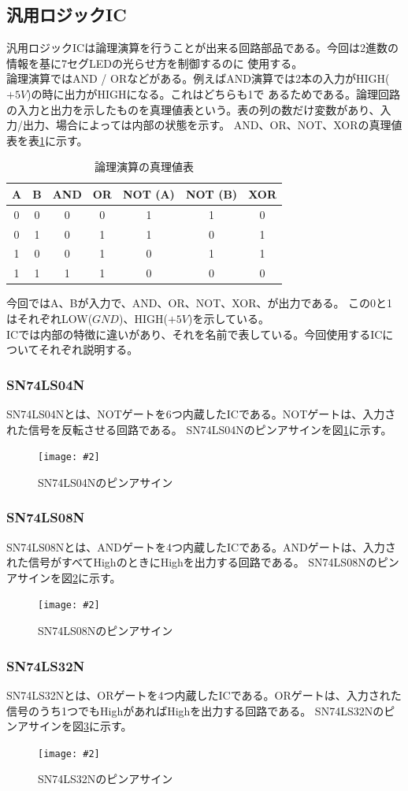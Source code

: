 \documentclass[a4paper,11pt,dvipdfmx]{jsarticle}
\newcommand{\Figure}[4]{
  \begin{figure}[H]
    \centering
    \texttt{[image: \#2]}
    \caption{#3}
    \label{fig:#4}
  \end{figure}
}
\begin{document}
\subsection{汎用ロジックIC}
汎用ロジックICは論理演算を行うことが出来る回路部品である。今回は2進数の情報を基に7セグLEDの光らせ方を制御するのに
使用する。\\
論理演算ではAND / ORなどがある。例えばAND演算では2本の入力がHIGH($+5V$)の時に出力がHIGHになる。これはどちらも1で
あるためである。論理回路の入力と出力を示したものを真理値表という。表の列の数だけ変数があり、入力/出力、場合によっては内部の状態を示す。
AND、OR、NOT、XORの真理値表を表\ref{tab:logic}に示す。
\begin{table}[H]
  \centering
  \caption{論理演算の真理値表}
  \begin{tabular}{|c|c|c|c|c|c|c|}
    \hline
    A & B & AND & OR & NOT (A) & NOT (B) & XOR \\
    \hline
    0 & 0 & 0 & 0 & 1 & 1 & 0 \\
    0 & 1 & 0 & 1 & 1 & 0 & 1 \\
    1 & 0 & 0 & 1 & 0 & 1 & 1 \\
    1 & 1 & 1 & 1 & 0 & 0 & 0 \\
    \hline
  \end{tabular}
  \label{tab:logic}
\end{table}
今回ではA、Bが入力で、AND、OR、NOT、XOR、が出力である。
この0と1はそれぞれLOW($GND$)、HIGH($+5V$)を示している。\\
ICでは内部の特徴に違いがあり、それを名前で表している。今回使用するICについてそれぞれ説明する。
\subsubsection{SN74LS04N}
SN74LS04Nとは、NOTゲートを6つ内蔵したICである。NOTゲートは、入力された信号を反転させる回路である。
SN74LS04Nのピンアサインを図\ref{fig:NOT}に示す。
\Figure{0.4}{./images/74LS04.png}{SN74LS04Nのピンアサイン}{NOT}

\subsubsection{SN74LS08N}
SN74LS08Nとは、ANDゲートを4つ内蔵したICである。ANDゲートは、入力された信号がすべてHighのときにHighを出力する回路である。
SN74LS08Nのピンアサインを図\ref{fig:AND}に示す。
\Figure{0.4}{./images/74LS08.png}{SN74LS08Nのピンアサイン}{AND}

\subsubsection{SN74LS32N}
SN74LS32Nとは、ORゲートを4つ内蔵したICである。ORゲートは、入力された信号のうち1つでもHighがあればHighを出力する回路である。
SN74LS32Nのピンアサインを図\ref{fig:OR}に示す。
\Figure{0.4}{./images/74LS32.png}{SN74LS32Nのピンアサイン}{OR}
\end{document}
